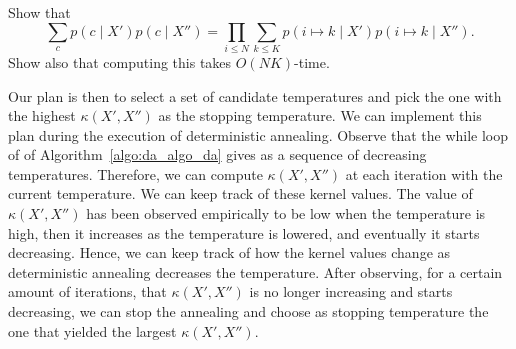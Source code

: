 \begin{exercise}
Show that
%
\begin{equation}
\sum_{c}p(c \mid X') p(c \mid X'') = \prod_{i \leq N}\sum_{k \leq K}p\left(i \mapsto k \mid X'\right)p\left(i \mapsto k \mid X''\right).
\end{equation}
%
Show also that computing this takes $O(NK)$-time.
\end{exercise}

Our plan is then to select a set of candidate temperatures and pick the
one with the highest $\kappa(X', X'')$ as the stopping temperature. We can implement
this plan during the execution of deterministic annealing. Observe
that the while loop of of Algorithm~\ref{algo:da_algo_da} gives as a sequence of decreasing
temperatures. Therefore, we can compute $\kappa(X', X'')$ at each iteration
with the current temperature. We can keep track of these kernel values.
The value of $\kappa(X', X'')$ has been observed empirically to be low when the
temperature is high, then it increases as the temperature is lowered, and
eventually it starts decreasing. Hence, we can keep track of how the kernel
values change as deterministic annealing decreases the temperature. After
observing, for a certain amount of iterations, that $\kappa(X', X'')$ is no longer
increasing and starts decreasing, we can stop the annealing and choose as
stopping temperature the one that yielded the largest $\kappa(X', X'')$.